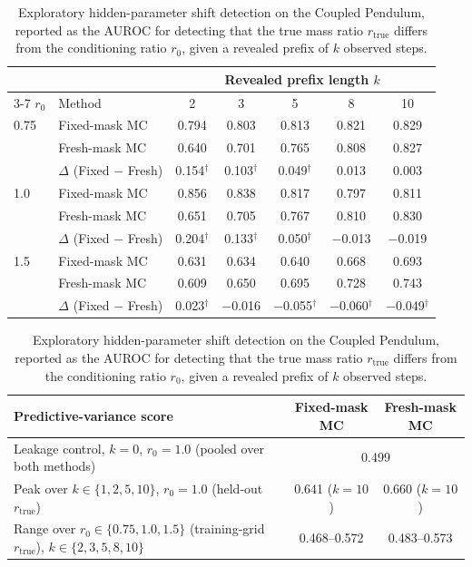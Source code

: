 \begin{table}[t]
\centering
\footnotesize
\setlength{\tabcolsep}{4pt}
\caption{Exploratory hidden-parameter shift detection on the Coupled Pendulum, reported as the AUROC for detecting that the true mass ratio $r_{\mathrm{true}}$ differs from the conditioning ratio $r_0$, given a revealed prefix of $k$ observed steps.}
\label{tab:hidden-param-detection}
\begin{tabular}{llccccc}
\toprule
 & & \multicolumn{5}{c}{Revealed prefix length $k$} \\
\cmidrule(lr){3-7}
$r_0$ & Method & 2 & 3 & 5 & 8 & 10 \\
\midrule
0.75 & Fixed-mask MC & 0.794 & 0.803 & 0.813 & 0.821 & 0.829 \\
 & Fresh-mask MC & 0.640 & 0.701 & 0.765 & 0.808 & 0.827 \\
 & $\Delta$ (Fixed $-$ Fresh) & 0.154$^{\dagger}$ & 0.103$^{\dagger}$ & 0.049$^{\dagger}$ & 0.013 & 0.003 \\
\midrule
1.0 & Fixed-mask MC & 0.856 & 0.838 & 0.817 & 0.797 & 0.811 \\
 & Fresh-mask MC & 0.651 & 0.705 & 0.767 & 0.810 & 0.830 \\
 & $\Delta$ (Fixed $-$ Fresh) & 0.204$^{\dagger}$ & 0.133$^{\dagger}$ & 0.050$^{\dagger}$ & $-$0.013 & $-$0.019 \\
\midrule
1.5 & Fixed-mask MC & 0.631 & 0.634 & 0.640 & 0.668 & 0.693 \\
 & Fresh-mask MC & 0.609 & 0.650 & 0.695 & 0.728 & 0.743 \\
 & $\Delta$ (Fixed $-$ Fresh) & 0.023$^{\dagger}$ & $-$0.016 & $-$0.055$^{\dagger}$ & $-$0.060$^{\dagger}$ & $-$0.049$^{\dagger}$ \\
\bottomrule
\end{tabular}
\par\smallskip
\begin{tabular}{lcc}
\toprule
Predictive-variance score & Fixed-mask MC & Fresh-mask MC \\
\midrule
Leakage control, $k=0$, $r_0=1.0$ (pooled over both methods) & \multicolumn{2}{c}{0.499} \\
Peak over $k\in\{1,2,5,10\}$, $r_0=1.0$ (held-out $r_{\mathrm{true}}$) & 0.641 ($k=10$) & 0.660 ($k=10$) \\
Range over $r_0\in\{0.75,1.0,1.5\}$ (training-grid $r_{\mathrm{true}}$), $k\in\{2,3,5,8,10\}$ & 0.468--0.572 & 0.483--0.573 \\
\bottomrule
\end{tabular}
\par{}
\end{table}
